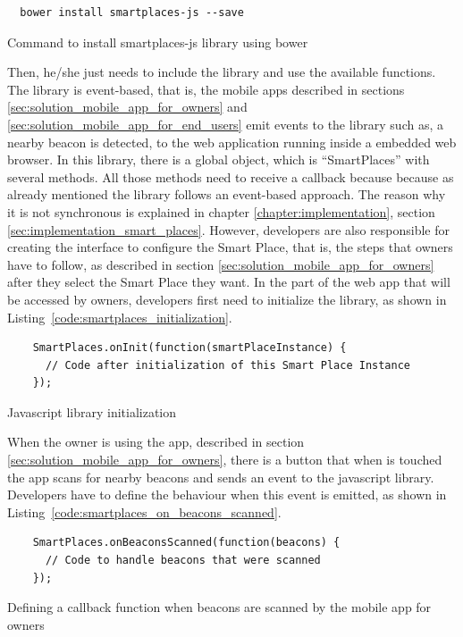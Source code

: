 \begin{listing}[H]
  \begin{verbatim}
  bower install smartplaces-js --save
  \end{verbatim}
  \caption[Library installation using Bower]{Command to install smartplaces-js library using bower}
  \label{code:bower_install}
\end{listing}
Then, he/she just needs to include the library and use the available functions.
The library is event-based, that is, the mobile apps described in sections \ref{sec:solution_mobile_app_for_owners} and \ref{sec:solution_mobile_app_for_end_users} emit events to the library such as, a nearby beacon is detected, to the web application running inside a embedded web browser.
In this library, there is a global object, which is ``SmartPlaces'' with several methods.
All those methods need to receive a callback because because as already mentioned the library follows an event-based approach.
The reason why it is not synchronous is explained in chapter \ref{chapter:implementation}, section \ref{sec:implementation_smart_places}.
However, developers are also responsible for creating the interface to configure the Smart Place, that is, the steps that owners have to follow, as described in section \ref{sec:solution_mobile_app_for_owners} after they select the Smart Place they want.
In the part of the web app that will be accessed by owners, developers first need to initialize the library, as shown in Listing~\ref{code:smartplaces_initialization}.
\begin{listing}[H]
  \begin{verbatim}
    SmartPlaces.onInit(function(smartPlaceInstance) {
      // Code after initialization of this Smart Place Instance
    });
  \end{verbatim}
  \caption[Javascript library initialization]{Javascript library initialization}
  \label{code:smartplaces_initialization}
\end{listing}

When the owner is using the app, described in section \ref{sec:solution_mobile_app_for_owners}, there is a button that when is touched the app scans for nearby beacons and sends an event to the javascript library.
Developers have to define the behaviour when this event is emitted, as shown in
Listing~\ref{code:smartplaces_on_beacons_scanned}.

\begin{listing}[H]
  \begin{verbatim}
    SmartPlaces.onBeaconsScanned(function(beacons) {
      // Code to handle beacons that were scanned
    });
  \end{verbatim}
  \caption[Beacons scanned]{Defining a callback function when beacons are scanned by the mobile app for owners}
  \label{code:smartplaces_on_beacons_scanned}
\end{listing}

